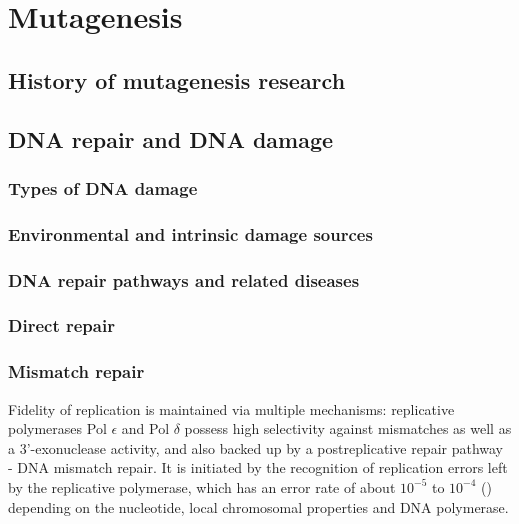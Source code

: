 
\pagestyle{empty}
\section{Mutagenesis}


\subsection{History of mutagenesis research}



\subsection{DNA repair and DNA damage}

\subsubsection{Types of DNA damage}

\subsubsection*{Environmental and intrinsic damage sources}

\subsubsection{DNA repair pathways and related diseases}

\subsubsection*{Direct repair}

\subsubsection*{Mismatch repair}

Fidelity of replication is maintained via multiple mechanisms: replicative polymerases 
Pol $\epsilon$ and Pol $\delta$ possess high selectivity against mismatches as well as a 
3'-exonuclease activity, and also backed up by a postreplicative repair pathway - DNA mismatch repair.
It is initiated by the recognition of replication errors left by the replicative polymerase, which 
has an error rate of about $10^{-5}$ to $10^{-4}$ (\cite{kunkel2000dna}) depending on the nucleotide,
local chromosomal properties and DNA polymerase.

